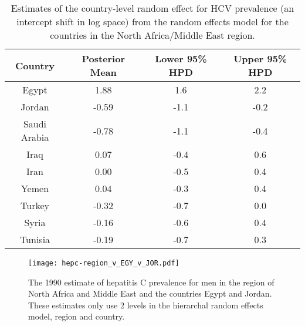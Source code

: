     \begin{table}[h]
        \begin{center}
        \begin{tabular}{|c|c|c|c|}
            \hline
                Country & Posterior Mean & Lower 95\% HPD  & Upper 95\%  HPD \\
            \hline
                Egypt	&	1.88	&	 1.6	&	2.2	\\
                Jordan	&	-0.59	&	-1.1	&	-0.2 \\
                Saudi Arabia	&	-0.78	&	-1.1	&	-0.4 \\
                Iraq	&	0.07	&	-0.4	&	0.6	\\
                Iran	&	0.00	&	-0.5	&	0.4	\\
                Yemen	&	0.04	&	-0.3	&	0.4	\\
                Turkey	&	-0.32	&	-0.7	&	0.0	\\
                Syria	&	-0.16	&	-0.6	&	0.4	\\
                Tunisia	&	-0.19	&	-0.7	&	0.3	\\
            \hline
        \end{tabular}
        \end{center}
        \caption{ Estimates of the country-level random effect for HCV
          prevalence (an intercept shift in log space) from the random
          effects model for the countries in the North Africa/Middle
          East region.}
        \label{tab:app-hepc regional rfx}
    \end{table}

    \begin{figure}[h]
        \begin{center}
            \texttt{[image: hepc-region\_v\_EGY\_v\_JOR.pdf]}
            \caption{The 1990 estimate of hepatitis C prevalence for
              men in the region of North Africa and Middle East and
              the countries Egypt and Jordan.  These estimates only
              use $2$ levels in the hierarchal random effects
              model, region and country.}
            \label{fig:app-hepc regional rfx}
        \end{center}
    \end{figure}

